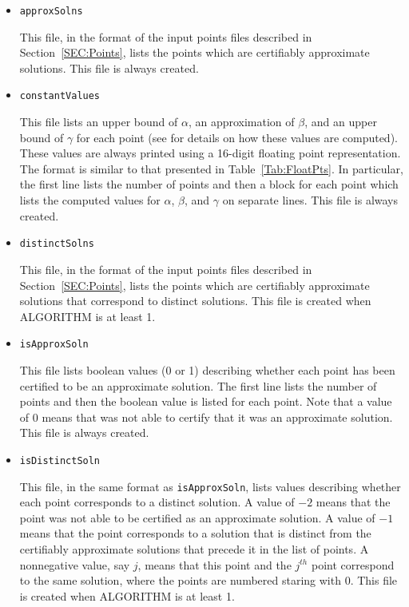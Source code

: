 \documentclass[11pt]{report}
\begin{document}
\begin{itemize}

\item {\tt approxSolns}

This file, in the format of the input points files described in Section~\ref{SEC:Points},
lists the points which are certifiably approximate solutions.  This file is always
created.

\item {\tt constantValues}

This file lists an upper bound of $\alpha$, an approximation of $\beta$, and an upper bound
of $\gamma$ for each point (see \cite{HS10} for details on how these values are computed).
These values are always printed using a 16-digit floating point representation.  The format is similar
to that presented in Table~\ref{Tab:FloatPts}.  In particular, the first line lists the number
of points and then a block for each point which lists the computed values for $\alpha$, $\beta$,
and $\gamma$ on separate lines.  This file is always created.

\item {\tt distinctSolns}

This file, in the format of the input points files described in Section~\ref{SEC:Points},
lists the points which are certifiably approximate solutions that correspond to distinct
solutions.  This file is created when ALGORITHM is at least 1.

\item {\tt isApproxSoln}

This file lists boolean values (0 or 1) describing whether each point has been
certified to be an approximate solution.   The first line lists the number of points
and then the boolean value is listed for each point.  Note that a value of 0 means
that \alphaCertifiedS was not able to certify that it was an approximate solution.
This file is always created.

\item {\tt isDistinctSoln}

This file, in the same format as {\tt isApproxSoln}, lists values describing whether
each point corresponds to a distinct solution.  A value of $-2$ means that the
point was not able to be certified as an approximate solution.  A value of $-1$
means that the point corresponds to a solution that is distinct from the
certifiably approximate solutions that precede it in the list of points.
A nonnegative value, say $j$, means that this point and the $j^{th}$ point
correspond to the same solution, where the points are numbered staring with 0.
This file is created when ALGORITHM is at least 1.


\end{itemize}
\end{document}
